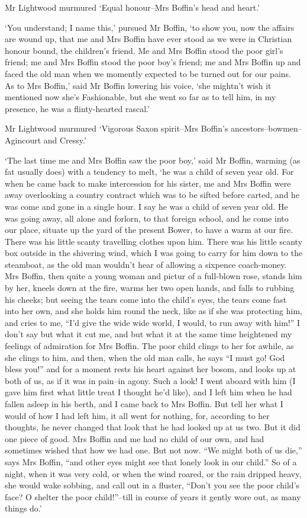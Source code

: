 Mr Lightwood murmured ‘Equal honour--Mrs Boffin’s head and heart.’

‘You understand; I name this,’ pursued Mr Boffin, ‘to show you, now the
affairs are wound up, that me and Mrs Boffin have ever stood as we were
in Christian honour bound, the children’s friend. Me and Mrs Boffin
stood the poor girl’s friend; me and Mrs Boffin stood the poor boy’s
friend; me and Mrs Boffin up and faced the old man when we momently
expected to be turned out for our pains. As to Mrs Boffin,’ said Mr
Boffin lowering his voice, ‘she mightn’t wish it mentioned now she’s
Fashionable, but she went so far as to tell him, in my presence, he was
a flinty-hearted rascal.’

Mr Lightwood murmured ‘Vigorous Saxon spirit--Mrs Boffin’s
ancestors--bowmen--Agincourt and Cressy.’

‘The last time me and Mrs Boffin saw the poor boy,’ said Mr Boffin,
warming (as fat usually does) with a tendency to melt, ‘he was a child
of seven year old. For when he came back to make intercession for his
sister, me and Mrs Boffin were away overlooking a country contract which
was to be sifted before carted, and he was come and gone in a single
hour. I say he was a child of seven year old. He was going away, all
alone and forlorn, to that foreign school, and he come into our place,
situate up the yard of the present Bower, to have a warm at our fire.
There was his little scanty travelling clothes upon him. There was his
little scanty box outside in the shivering wind, which I was going to
carry for him down to the steamboat, as the old man wouldn’t hear of
allowing a sixpence coach-money. Mrs Boffin, then quite a young woman
and pictur of a full-blown rose, stands him by her, kneels down at the
fire, warms her two open hands, and falls to rubbing his cheeks; but
seeing the tears come into the child’s eyes, the tears come fast into
her own, and she holds him round the neck, like as if she was protecting
him, and cries to me, “I’d give the wide wide world, I would, to run
away with him!” I don’t say but what it cut me, and but what it at the
same time heightened my feelings of admiration for Mrs Boffin. The poor
child clings to her for awhile, as she clings to him, and then, when
the old man calls, he says “I must go! God bless you!” and for a moment
rests his heart against her bosom, and looks up at both of us, as if it
was in pain--in agony. Such a look! I went aboard with him (I gave him
first what little treat I thought he’d like), and I left him when he had
fallen asleep in his berth, and I came back to Mrs Boffin. But tell
her what I would of how I had left him, it all went for nothing, for,
according to her thoughts, he never changed that look that he had looked
up at us two. But it did one piece of good. Mrs Boffin and me had no
child of our own, and had sometimes wished that how we had one. But not
now. “We might both of us die,” says Mrs Boffin, “and other eyes might
see that lonely look in our child.” So of a night, when it was very
cold, or when the wind roared, or the rain dripped heavy, she would
wake sobbing, and call out in a fluster, “Don’t you see the poor child’s
face? O shelter the poor child!”--till in course of years it gently wore
out, as many things do.’

